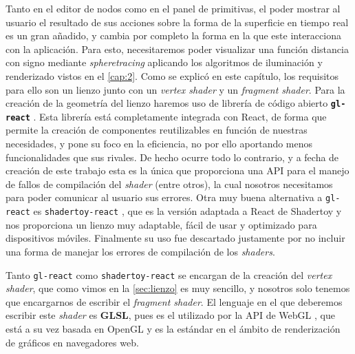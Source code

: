 Tanto en el editor de nodos como en el panel de primitivas, el poder mostrar al usuario el resultado de sus acciones sobre la forma de la superficie en tiempo real es un gran añadido, y cambia por completo la forma en la que este interacciona con la aplicación. Para esto, necesitaremos poder visualizar una función distancia con signo mediante \textit{spheretracing} aplicando los algoritmos de iluminación y renderizado vistos en el \autoref{cap:2}. Como se explicó en este capítulo, los requisitos para ello son un lienzo junto con un \textit{vertex shader} y un \textit{fragment shader}. Para la creación de la geometría del lienzo haremos uso de librería de código abierto \textbf{\texttt{gl-react}} \cite{gl-react}. Esta librería está completamente integrada con React, de forma que permite la creación de componentes reutilizables en función de nuestras necesidades, y pone su foco en la eficiencia, no por ello aportando menos funcionalidades que sus rivales. De hecho ocurre todo lo contrario, y a fecha de creación de este trabajo esta es la única que proporciona una API para el manejo de fallos de compilación del \textit{shader} (entre otros), la cual nosotros necesitamos para poder comunicar al usuario sus errores. Otra muy buena alternativa a \texttt{gl-react} es \texttt{shadertoy-react} \cite{shadertoy-react}, que es la versión adaptada a React de Shadertoy y nos proporciona un lienzo muy adaptable, fácil de usar y optimizado para dispositivos móviles. Finalmente su uso fue descartado justamente por no incluir una forma de manejar los errores de compilación de los \textit{shaders}.\newline

Tanto \texttt{gl-react} como \texttt{shadertoy-react} se encargan de la creación del \textit{vertex shader}, que como vimos en la \autoref{sec:lienzo} es muy sencillo, y nosotros solo tenemos que encargarnos de escribir el \textit{fragment shader}. El lenguaje en el que deberemos escribir este \textit{shader} es \textbf{GLSL}, pues es el utilizado por la API de WebGL \cite{webgl_main}, que está a su vez basada en OpenGL y es la estándar en el ámbito de renderización de gráficos en navegadores web.\newline

